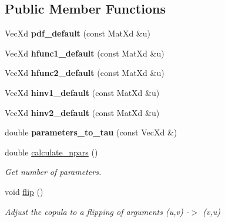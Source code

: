 \subsection*{Public Member Functions}
\begin{DoxyCompactItemize}
\item 
\hypertarget{class_kernel_bicop_aa5c384abe680e15e68ee753ba07383b9}{Vec\+Xd {\bfseries pdf\+\_\+default} (const Mat\+Xd \&u)}\label{class_kernel_bicop_aa5c384abe680e15e68ee753ba07383b9}

\item 
\hypertarget{class_kernel_bicop_a813b02c149cdfdecd19f7d75b48a5750}{Vec\+Xd {\bfseries hfunc1\+\_\+default} (const Mat\+Xd \&u)}\label{class_kernel_bicop_a813b02c149cdfdecd19f7d75b48a5750}

\item 
\hypertarget{class_kernel_bicop_a50d6ee40f8ad1cacf26207aeca593ce7}{Vec\+Xd {\bfseries hfunc2\+\_\+default} (const Mat\+Xd \&u)}\label{class_kernel_bicop_a50d6ee40f8ad1cacf26207aeca593ce7}

\item 
\hypertarget{class_kernel_bicop_aef4490ec07370b9d94da42ffc66472bb}{Vec\+Xd {\bfseries hinv1\+\_\+default} (const Mat\+Xd \&u)}\label{class_kernel_bicop_aef4490ec07370b9d94da42ffc66472bb}

\item 
\hypertarget{class_kernel_bicop_aaa8f2330ce0be70f2963ad2c9fbe3bc9}{Vec\+Xd {\bfseries hinv2\+\_\+default} (const Mat\+Xd \&u)}\label{class_kernel_bicop_aaa8f2330ce0be70f2963ad2c9fbe3bc9}

\item 
\hypertarget{class_kernel_bicop_a75af40b7db1c24278ea373f0633a9b22}{double {\bfseries parameters\+\_\+to\+\_\+tau} (const Vec\+Xd \&)}\label{class_kernel_bicop_a75af40b7db1c24278ea373f0633a9b22}

\item 
\hypertarget{class_kernel_bicop_a631fd1cf2a05f30353ed9048839fae85}{double \hyperlink{class_kernel_bicop_a631fd1cf2a05f30353ed9048839fae85}{calculate\+\_\+npars} ()}\label{class_kernel_bicop_a631fd1cf2a05f30353ed9048839fae85}

\begin{DoxyCompactList}\small\item\em Get number of parameters. \end{DoxyCompactList}\item 
\hypertarget{class_kernel_bicop_a671e7f0f6d43e4eed35aceda3f70ab58}{void \hyperlink{class_kernel_bicop_a671e7f0f6d43e4eed35aceda3f70ab58}{flip} ()}\label{class_kernel_bicop_a671e7f0f6d43e4eed35aceda3f70ab58}

\begin{DoxyCompactList}\small\item\em Adjust the copula to a flipping of arguments (u,v) -\/$>$ (v,u) \end{DoxyCompactList}\end{DoxyCompactItemize}
